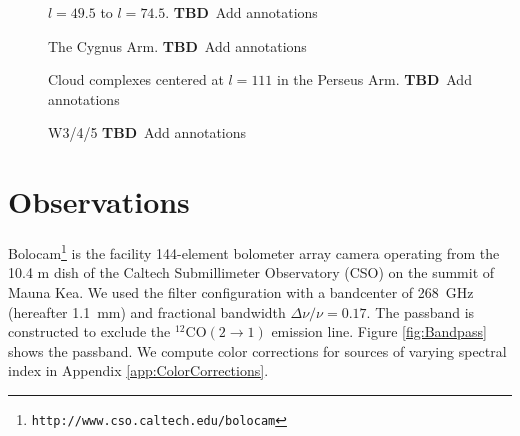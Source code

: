 \documentclass[12pt,preprint]{aastex}
\newcommand{\TBD}{{\bf TBD}}
\begin{document}
\begin{figure}
  \begin{minipage}{6.5in} 
    \begin{center}
      \caption{$l=49.5$ to $l=74.5$.  \TBD\ Add annotations}
    \end{center}
  \end{minipage}
\end{figure}

\addtocounter{figure}{-1}
\addtocounter{subfig}{1}

\begin{figure}
  \hspace{-1in}
  \caption{The Cygnus Arm. \TBD\ Add annotations}
\end{figure}

\addtocounter{figure}{-1}
\addtocounter{subfig}{1}

\begin{figure}
\hspace{-0.5in}
  \caption{Cloud complexes centered at $l=111$ in the Perseus Arm. \TBD\ Add annotations}
\end{figure}

\addtocounter{figure}{-1}
\addtocounter{subfig}{1}

\begin{figure}
  \hspace{-1in}
  \caption{W3/4/5 \TBD\ Add annotations}
\end{figure}

\renewcommand{\thefigure}{\arabic{figure}}

\clearpage

%
\section{Observations}
\label{sec:Observations}


Bolocam\footnote{{\tt http://www.cso.caltech.edu/bolocam}} is the
facility 144-element bolometer array camera operating from the 10.4 m
dish of the Caltech Submillimeter Observatory (CSO) on the summit of
Mauna Kea.  We used the filter configuration with a bandcenter of
268~GHz (hereafter 1.1~mm) and fractional bandwidth $\Delta \nu/\nu =
0.17$.  The passband is constructed to exclude the $^{12}\mathrm{CO}(2
\to 1)$ emission line.  Figure \ref{fig:Bandpass} shows the passband.
We compute color corrections for sources of varying spectral index in
Appendix \ref{app:ColorCorrections}.
\end{document}
